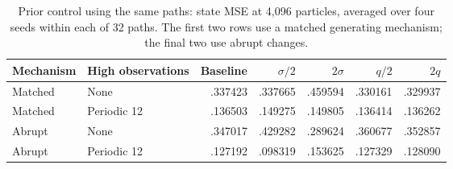 \documentclass[11pt,a4paper]{article}
\begin{document}
\begin{table}[h]
\centering\small
\caption{Prior control using the same paths: state MSE at 4,096 particles, averaged over four seeds within each of 32 paths. The first two rows use a matched generating mechanism; the final two use abrupt changes.}
\label{tab:priors}
\begin{tabular}{@{}llrrrrr@{}}
\toprule
Mechanism & High observations & Baseline & $\sigma/2$ & $2\sigma$ & $q/2$ & $2q$\\
\midrule
Matched & None & .337423 & .337665 & .459594 & .330161 & .329937\\
Matched & Periodic 12 & .136503 & .149275 & .149805 & .136414 & .136262\\
Abrupt & None & .347017 & .429282 & .289624 & .360677 & .352857\\
Abrupt & Periodic 12 & .127192 & .098319 & .153625 & .127329 & .128090\\
\bottomrule
\end{tabular}
\end{table}
\end{document}
